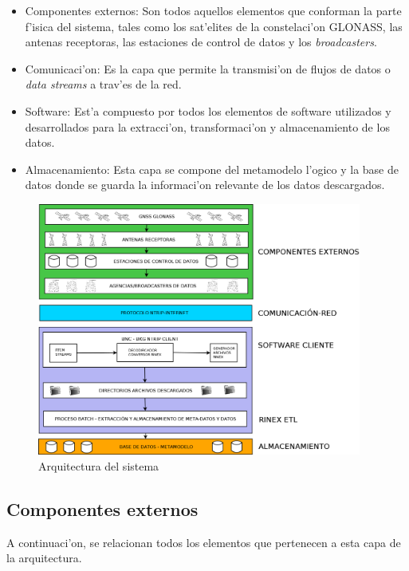 \begin{itemize}
\item Componentes externos: Son todos aquellos elementos que conforman la parte f'isica del sistema, tales como los sat'elites de la constelaci'on GLONASS, las antenas receptoras, las estaciones de control de datos y los \emph{broadcasters}.

\item Comunicaci'on: Es la capa que permite la transmisi'on de flujos de datos o \emph{data streams} a trav'es de la red.

\item Software: Est'a compuesto por todos los elementos de software utilizados y desarrollados para la extracci'on, transformaci'on y almacenamiento de los datos.

\item Almacenamiento: Esta capa se compone del metamodelo l'ogico y la base de datos donde se guarda la informaci'on relevante de los datos descargados.
\end{itemize}

\begin{figure}[H]
\centering
\includegraphics[width=0.95\textwidth]{images/ARQUITECTURA_SISTEMA}
\caption{Arquitectura del sistema}
\label{fig:4.2}
\end{figure}

\subsection{Componentes externos}
\noindent
A continuaci'on, se relacionan todos los elementos que pertenecen a esta capa de la arquitectura.

